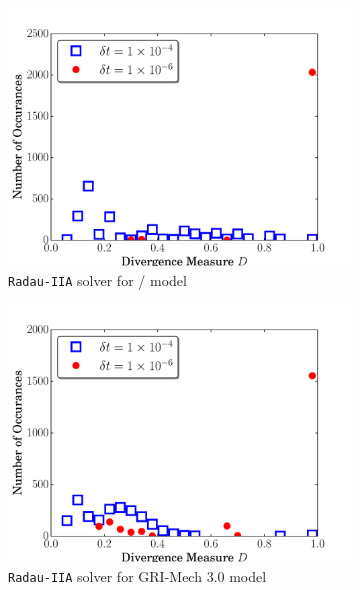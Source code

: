 \documentclass[preprint]{elsarticle}
\begin{document}
\begin{figure}[htb]
  \centering
  \begin{subfigure}{0.49\textwidth}
      \includegraphics[width=\linewidth]{H2_radau2a_div.pdf}
      \caption{\texttt{Radau-IIA} solver for \slash{} model}
      \label{F:Rad_div_h2}
  \end{subfigure}
  \begin{subfigure}{0.49\textwidth}
      \includegraphics[width=\linewidth]{CH4_radau2a_div.pdf}
      \caption{\texttt{Radau-IIA} solver for GRI-Mech 3.0 model}
      \label{F:Rad_div_gri}
  \end{subfigure}
  \\
  \begin{subfigure}{0.49\textwidth}

\end{subfigure}
\end{figure}
\end{document}
